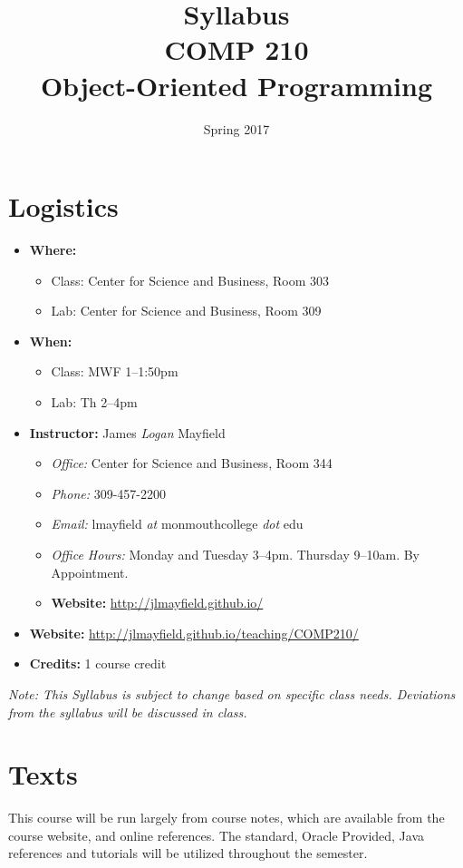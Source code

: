 \documentclass[10pt]{article}
\title{Syllabus \\ COMP 210 \\ Object-Oriented Programming}
\author{ }
\date{Spring 2017}
\begin{document}
\maketitle

\section{Logistics}
\begin{itemize}
\item \textbf{Where: }
\begin{itemize}
\item Class: Center for Science and Business, Room 303
\item Lab: Center for Science and Business, Room 309
\end{itemize}
\item \textbf{When: }
\begin{itemize}
\item Class: MWF 1--1:50pm
\item Lab: Th 2--4pm
\end{itemize}
\item \textbf{Instructor: } James \textit{Logan} Mayfield
\begin{itemize}
\item \textit{Office: } Center for Science and Business, Room 344
\item \textit{Phone: } 309-457-2200 %
\item \textit{Email: } lmayfield \textit{at} monmouthcollege \textit{dot} edu
\item \textit{Office Hours: } Monday and Tuesday 3--4pm. Thursday 9--10am. By Appointment.
\item \textbf{Website: } \url{http://jlmayfield.github.io/}
\end{itemize}
\item \textbf{Website: } \url{http://jlmayfield.github.io/teaching/COMP210/}
\item \textbf{Credits: } 1 course credit
\end{itemize}
\emph{Note: This Syllabus is subject to change based on specific class needs. Deviations from the syllabus will be discussed in class.}


\section{Texts}

This course will be run largely from course notes, which are available from the course website, and online references. The standard, Oracle Provided, Java references and tutorials will be utilized throughout the semester.
\vspace{.25in}
\end{document}
